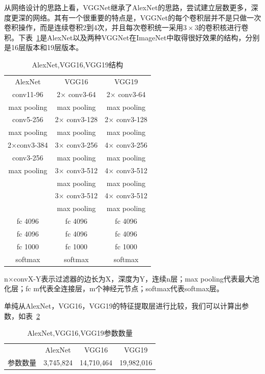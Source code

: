 从网络设计的思路上看，VGGNet继承了AlexNet的思路，尝试建立层数更多，深度更深的网络。其有一个很重要的特点是，VGGNet的每个卷积层并不是只做一次卷积操作，而是连续卷积2到4次，并且每次卷积统一采用$3\times3$的卷积核进行卷积。下表~\ref{fig:cnn5}是AlexNet以及两种VGGNet在ImageNet中取得很好效果的结构，分别是16层版本和19层版本。
\begin{table}[htb]
\centering
\caption{AlexNet,VGG16,VGG19结构}
\begin{tabular}{ccc}
\toprule[2pt]
AlexNet & VGG16 & VGG19 \\ 
conv11-96 & 2$\times$ conv3-64 & 2$\times$ conv3-64 \\  
max pooling & max pooling & max pooling \\  
conv5-256 & 2$\times$ conv3-128 & 2$\times$ conv3-128 \\  
max pooling & max pooling & max pooling \\  
2$\times$conv3-384 & 3$\times$ conv3-256 & 4$\times$ conv3-256 \\  
conv3-256 & max pooling & max pooling \\ 
max pooling & 3$\times$ conv3-512 & 4$\times$ conv3-512 \\  
\ & max pooling & max pooling \\ 
\ & 3$\times$ conv3-512 & 4$\times$ conv3-512 \\  
\ & max pooling & max pooling  \\  
fc 4096 & fc 4096 & fc 4096 \\ 
fc 4096 & fc 4096 & fc 4096 \\ 
fc 1000 & fc 1000 & fc 1000 \\ 
softmax & softmax & softmax \\ 
\bottomrule[2pt]
\end{tabular} 
\label{fig:cnn5}
\end{table}
n$\times$convX-Y表示过滤器的边长为X，深度为Y，连续n层；max pooling代表最大池化层；fc m代表全连接层，m个神经元节点；softmax代表softmax层。

单纯从AlexNet，VGG16，VGG19的特征提取层进行比较，我们可以计算出参数，如表~\ref{fig:cnn6}
\begin{table}[htb]
\centering
\caption{AlexNet,VGG16,VGG19参数数量}
\begin{tabular}{cccc}
\toprule[2pt]
\ & AlexNet & VGG16 & VGG19 \\ 
参数数量 & 3,745,824 & 14,710,464 & 19,982,016 \\ 
\bottomrule[2pt]
\end{tabular} 
\label{fig:cnn6}
\end{table}




